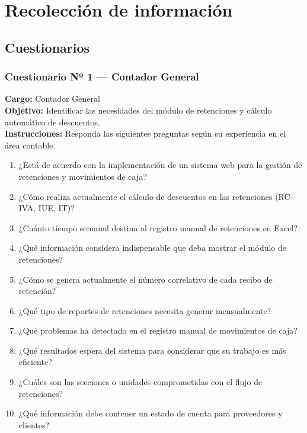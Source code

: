 \documentclass[stu]{apa7}
\begin{document}
\newpage

\section{Recolección de información}

\subsection{Cuestionarios}

\subsubsection{Cuestionario Nº 1 --- Contador General}

\textbf{Cargo:} Contador General \\
\textbf{Objetivo:} Identificar las necesidades del módulo de retenciones y cálculo automático de descuentos. \\
\textbf{Instrucciones:} Responda las siguientes preguntas según su experiencia en el área contable.

\begin{enumerate}
    \item ¿Está de acuerdo con la implementación de un sistema web para la gestión de retenciones y movimientos de caja?
    \item ¿Cómo realiza actualmente el cálculo de descuentos en las retenciones (RC-IVA, IUE, IT)?
    \item ¿Cuánto tiempo semanal destina al registro manual de retenciones en Excel?
    \item ¿Qué información considera indispensable que deba mostrar el módulo de retenciones?
    \item ¿Cómo se genera actualmente el número correlativo de cada recibo de retención?
    \item ¿Qué tipo de reportes de retenciones necesita generar mensualmente?
    \item ¿Qué problemas ha detectado en el registro manual de movimientos de caja?
    \item ¿Qué resultados espera del sistema para considerar que su trabajo es más eficiente?
    \item ¿Cuáles son las secciones o unidades comprometidas con el flujo de retenciones?
    \item ¿Qué información debe contener un estado de cuenta para proveedores y clientes?
\end{enumerate}
\end{document}
